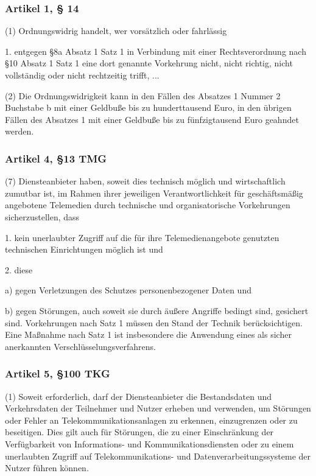 \documentclass[11pt]{beamer}
\begin{document}
	\begin{frame}
		\frametitle{Artikel 1, § 14}
		(1) Ordnungswidrig handelt, wer vorsätzlich oder fahrlässig
		
		1. entgegen §8a Absatz 1 Satz 1 in Verbindung mit einer Rechtsverordnung nach §10 Absatz 1 Satz 1 eine dort genannte Vorkehrung nicht, nicht richtig, nicht vollständig oder nicht rechtzeitig trifft, ...
		
		(2) Die Ordnungswidrigkeit kann in den Fällen des Absatzes 1 Nummer 2 Buchstabe b mit einer Geldbuße bis zu hunderttausend Euro, in den übrigen Fällen des Absatzes 1 mit einer Geldbuße bis zu fünfzigtausend Euro geahndet werden.
		
	\end{frame}

	\begin{frame}
		\frametitle{Artikel 4, §13 TMG}
		(7) Diensteanbieter haben, soweit dies technisch möglich und wirtschaftlich zumutbar ist,
		im Rahmen ihrer jeweiligen Verantwortlichkeit für geschäftsmäßig angebotene Telemedien durch
		technische und organisatorische Vorkehrungen sicherzustellen, dass
		
		1. kein unerlaubter Zugriff auf die für ihre Telemedienangebote genutzten technischen Einrichtungen möglich ist und
		
		2. diese
		
		a) gegen Verletzungen des Schutzes personenbezogener Daten und
		
		b) gegen Störungen, auch soweit sie durch äußere Angriffe bedingt sind, gesichert sind. Vorkehrungen nach Satz 1 müssen den Stand der Technik berücksichtigen. Eine Maßnahme nach Satz 1 ist insbesondere die Anwendung eines als sicher anerkannten Verschlüsselungsverfahrens.
	\end{frame}
	
	\begin{frame}
		\frametitle{Artikel 5, §100 TKG}
		(1) Soweit erforderlich, darf der Diensteanbieter die Bestandsdaten und Verkehrsdaten der Teilnehmer und Nutzer erheben und verwenden, um Störungen oder Fehler an Telekommunikationsanlagen zu erkennen, einzugrenzen oder zu beseitigen. Dies gilt
		auch für Störungen, die zu einer Einschränkung der Verfügbarkeit von Informations- und Kommunikationsdiensten oder zu einem unerlaubten Zugriff auf Telekommunikations- und Datenverarbeitungssysteme der Nutzer führen können.
	\end{frame}
\end{document}
